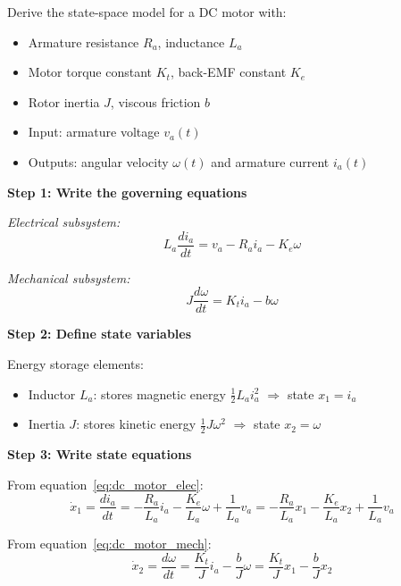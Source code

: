 \begin{example}
\label{ex:dc_motor}
Derive the state-space model for a DC motor with:
\begin{itemize}
    \item Armature resistance $R_a$, inductance $L_a$
    \item Motor torque constant $K_t$, back-EMF constant $K_e$
    \item Rotor inertia $J$, viscous friction $b$
    \item Input: armature voltage $v_a(t)$
    \item Outputs: angular velocity $\omega(t)$ and armature current $i_a(t)$
\end{itemize}

\textbf{Step 1: Write the governing equations}

\textit{Electrical subsystem:}
\begin{equation}
L_a \frac{di_a}{dt} = v_a - R_a i_a - K_e \omega
\label{eq:dc_motor_elec}
\end{equation}

\textit{Mechanical subsystem:}
\begin{equation}
J\frac{d\omega}{dt} = K_t i_a - b\omega
\label{eq:dc_motor_mech}
\end{equation}

\textbf{Step 2: Define state variables}

Energy storage elements:
\begin{itemize}
    \item Inductor $L_a$: stores magnetic energy $\frac{1}{2}L_a i_a^2$ $\Rightarrow$ state $x_1 = i_a$
    \item Inertia $J$: stores kinetic energy $\frac{1}{2}J\omega^2$ $\Rightarrow$ state $x_2 = \omega$
\end{itemize}

\textbf{Step 3: Write state equations}

From equation~\eqref{eq:dc_motor_elec}:
\begin{equation}
\dot{x}_1 = \frac{di_a}{dt} = -\frac{R_a}{L_a}i_a - \frac{K_e}{L_a}\omega + \frac{1}{L_a}v_a = -\frac{R_a}{L_a}x_1 - \frac{K_e}{L_a}x_2 + \frac{1}{L_a}v_a
\end{equation}

From equation~\eqref{eq:dc_motor_mech}:
\begin{equation}
\dot{x}_2 = \frac{d\omega}{dt} = \frac{K_t}{J}i_a - \frac{b}{J}\omega = \frac{K_t}{J}x_1 - \frac{b}{J}x_2
\end{equation}


\end{example}
